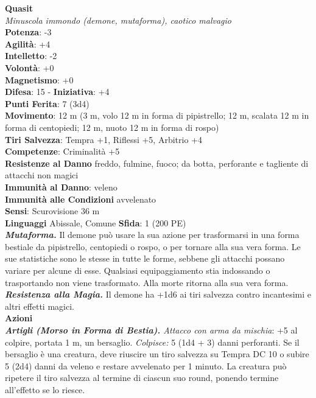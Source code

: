 \begin{multicols}{2}
\medskip\textbf{Quasit}\\
\emph{Minuscola immondo (demone, mutaforma), caotico malvagio}\\
\textbf{Potenza}: -3\\
\textbf{Agilità}: +4\\
\textbf{Intelletto}: -2\\
\textbf{Volontà}: +0\\
\textbf{Magnetismo}: +0\\
\textbf{Difesa}: 15 - \textbf{Iniziativa}: +4\\
\textbf{Punti Ferita}: 7 (3d4)\\
\textbf{Movimento}: 12 m (3 m, volo 12 m in forma di pipistrello; 12 m,
scalata 12 m in forma di centopiedi; 12 m, nuoto 12 m in forma di rospo)\\
\textbf{Tiri Salvezza}: Tempra +1, Riflessi +5, Arbitrio +4\\
\textbf{Competenze}: Criminalità +5\\
\textbf{Resistenze al Danno} freddo, fulmine, fuoco; da botta, perforante e tagliente di attacchi non magici\\
\textbf{Immunità al Danno}: veleno\\
\textbf{Immunità alle Condizioni} avvelenato\\
\textbf{Sensi}: Scurovisione 36 m \\
\textbf{Linguaggi} Abissale, Comune 
\textbf{Sfida}: 1 (200 PE)\smallskip\\
\emph{\textbf{Mutaforma.}} Il demone può usare la sua azione per trasformarsi in una forma bestiale da pipistrello, centopiedi o rospo, o per tornare alla sua vera forma. Le sue statistiche sono le stesse in tutte le forme, sebbene gli attacchi possano variare per alcune di esse. Qualsiasi equipaggiamento stia indossando o trasportando non viene trasformato. Alla morte ritorna alla sua vera forma.\\
\emph{\textbf{Resistenza alla Magia.}} Il demone ha +1d6 ai tiri salvezza contro incantesimi e altri effetti magici.\\
\smallskip\textbf{Azioni}\\
\emph{\textbf{Artigli (Morso in Forma di Bestia).} Attacco con arma da mischia}: +5 al colpire, portata 1 m, un bersaglio. \emph{Colpisce:} 5 (1d4 + 3) danni perforanti. Se il bersaglio è una creatura, deve riuscire un tiro salvezza su Tempra DC 10 o subire 5 (2d4) danni da veleno e restare avvelenato per 1 minuto. La creatura può ripetere il tiro salvezza al termine di ciascun suo round, ponendo termine all'effetto se lo riesce.\\

\end{multicols}
